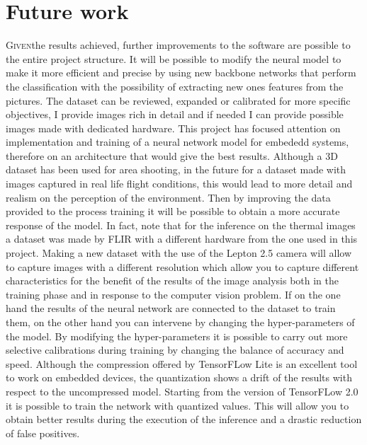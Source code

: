 \chapter{Future work}
\label{chap:future-work}
%
\lettrine[lines=3]{G}{iven}the results achieved, further improvements to the 
software are possible to the entire project structure. 
It will be possible to modify the neural model to make it more efficient and 
precise by using new backbone networks that perform the classification with the
possibility of extracting new ones features from the pictures. 
The dataset can be reviewed, expanded or calibrated for more specific
objectives, I provide images rich in detail and if needed I can provide possible
images made with dedicated hardware. 
This project has focused attention on implementation and training of a neural
network model for embededd systems, therefore on an architecture that would give
the best results. 
Although a 3D dataset has been used for area shooting, in the future for a
dataset made with images captured in real life flight conditions, this would
lead to more detail and realism on the perception of the environment. 
Then by improving the data provided to the process training it will be possible
to obtain a more accurate response of the model. 
In fact, note that for the inference on the thermal images a dataset was
made by FLIR with a different hardware from the one used in this project. 
Making a new dataset with the use of the Lepton 2.5 camera will allow to
capture images with a different resolution which allow you to capture
different characteristics for the benefit of the results of the image analysis
both in the training phase and in response to the computer vision problem. 
If on the one hand the results of the neural network are connected to the
dataset to train them, on the other hand you can intervene by changing the
hyper-parameters of the model. 
By modifying the hyper-parameters it is possible to carry out more selective
calibrations during training by changing the balance of accuracy and speed.
Although the compression offered by TensorFLow Lite is an excellent tool to work
on embedded devices, the quantization shows a drift of the results with respect
to the uncompressed model. Starting from the version of TensorFLow 2.0 it is
possible to train the network with quantized values. 
This will allow you to obtain better results during the execution of the
inference and a drastic reduction of false positives.